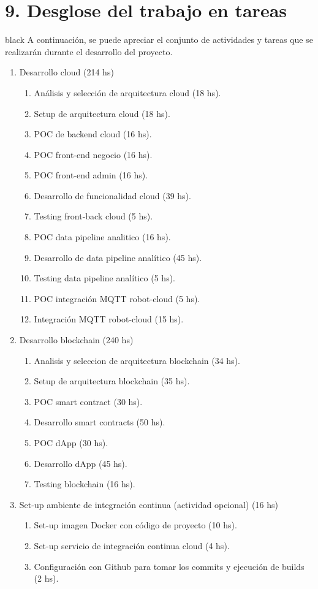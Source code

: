 \documentclass[
11pt, %
]{charter}
\begin{document}
\section{9. Desglose del trabajo en tareas}
\label{sec:wbs}

\begin{consigna}{black}
A continuación, se puede apreciar el conjunto de actividades y tareas que se realizarán durante el desarrollo del proyecto.
\begin{enumerate}

\item Desarrollo cloud (214 hs)
	\begin{enumerate}
	\item Análisis y selección de arquitectura cloud (18 hs).
	\item Setup de arquitectura cloud (18 hs).
	\item POC de backend cloud (16 hs).
	\item POC front-end negocio (16 hs).
	\item POC front-end admin (16 hs).
	\item Desarrollo de funcionalidad cloud (39 hs).
	\item Testing front-back cloud (5 hs).
	\item POC data pipeline analitico (16 hs).
	\item Desarrollo de data pipeline analítico (45 hs).
	\item Testing data pipeline analítico (5 hs).
	\item POC integración MQTT robot-cloud (5 hs).
	\item Integración MQTT robot-cloud (15 hs).
	\end{enumerate}

\item Desarrollo blockchain (240 hs)
	\begin{enumerate}
	\item Analisis y seleccion de arquitectura blockchain (34 hs).
	\item Setup de arquitectura blockchain (35 hs).
	\item POC smart contract (30 hs).
	\item Desarrollo smart contracts (50 hs).
	\item POC dApp (30 hs).
	\item Desarrollo dApp (45 hs).
	\item Testing blockchain (16 hs).
	\end{enumerate}

\item Set-up ambiente de integración continua (actividad opcional) (16 hs)
	\begin{enumerate}
	\item Set-up imagen Docker con código de proyecto (10 hs).
	\item Set-up servicio de integración continua cloud (4 hs).
	\item Configuración con Github para tomar los commits y ejecución de builds (2 hs).
	\end{enumerate}


\end{enumerate}
\end{consigna}
\end{document}
